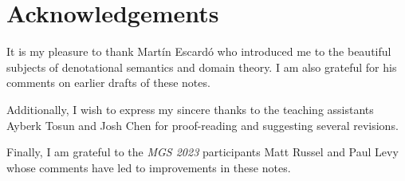 \chapter{Acknowledgements}

It is my pleasure to thank Mart\'in Escard\'o who introduced me to the beautiful
subjects of denotational semantics and domain theory. I am also grateful for his
comments on earlier drafts of these notes.

Additionally, I wish to express my sincere thanks to the teaching assistants
Ayberk Tosun and Josh Chen for proof-reading and suggesting several
revisions.

Finally, I am grateful to the \emph{MGS 2023} participants Matt Russel
and Paul Levy whose comments have led to improvements in these notes.


